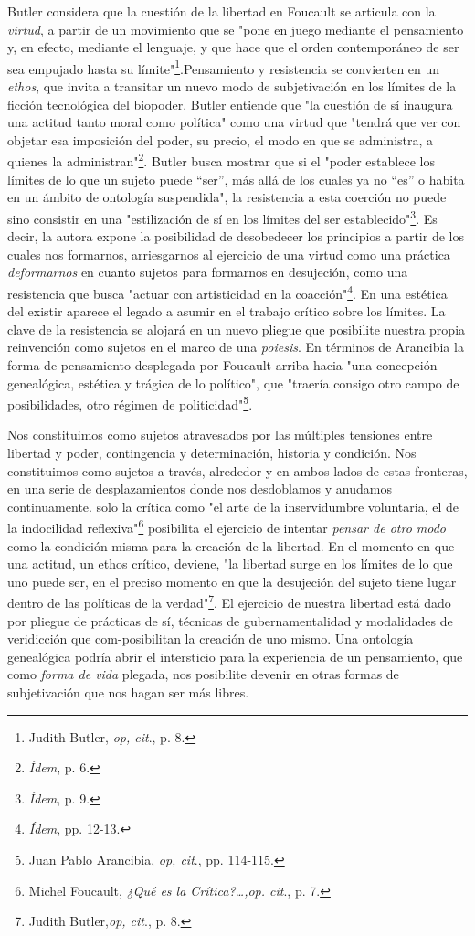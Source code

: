Butler considera que la cuestión de la libertad en Foucault se articula
con la \emph{virtud}, a partir de un movimiento que se "pone en juego
mediante el pensamiento y, en efecto, mediante el lenguaje, y que hace
que el orden contemporáneo de ser sea empujado hasta su
límite"\footnote{Judith Butler, \emph{op, cit}., p. 8.}.Pensamiento y
resistencia se convierten en un \emph{ethos}, que invita a transitar un
nuevo modo de subjetivación en los límites de la ficción tecnológica del
biopoder. Butler entiende que "la cuestión de sí inaugura una actitud
tanto moral como política" como una virtud que "tendrá que ver con
objetar esa imposición del poder, su precio, el modo en que se
administra, a quienes la administran"\footnote{\emph{Ídem}, p. 6.}.
Butler busca mostrar que si el "poder establece los límites de lo que un
sujeto puede ``ser'', más allá de los cuales ya no ``es'' o habita en un
ámbito de ontología suspendida", la resistencia a esta coerción no puede
sino consistir en una "estilización de sí en los límites del ser
establecido"\footnote{\emph{Ídem}, p. 9.}. Es decir, la autora expone la
posibilidad de desobedecer los principios a partir de los cuales nos
formarnos, arriesgarnos al ejercicio de una virtud como una práctica
\emph{deformarnos} en cuanto sujetos para formarnos en desujeción, como
una resistencia que busca "actuar con artisticidad en la
coacción"\footnote{\emph{Ídem}, pp. 12-13.}. En una estética del existir
aparece el legado a asumir en el trabajo crítico sobre los límites. La
clave de la resistencia se alojará en un nuevo pliegue que posibilite
nuestra propia reinvención como sujetos en el marco de una
\emph{poiesis}. En términos de Arancibia la forma de pensamiento
desplegada por Foucault arriba hacia "una concepción genealógica,
estética y trágica de lo político", que "traería consigo otro campo de
posibilidades, otro régimen de politicidad"\footnote{Juan Pablo
  Arancibia, \emph{op, cit}., pp. 114-115.}.

Nos constituimos como sujetos atravesados por las múltiples tensiones
entre libertad y poder, contingencia y determinación, historia y
condición. Nos constituimos como sujetos a través, alrededor y en ambos
lados de estas fronteras, en una serie de desplazamientos donde nos
desdoblamos y anudamos continuamente. solo la crítica como "el arte de
la inservidumbre voluntaria, el de la indocilidad reflexiva"\footnote{Michel
  Foucault, \emph{¿Qué es la Crítica?\ldots,op. cit}., p. 7.} posibilita
el ejercicio de intentar \emph{pensar de otro modo} como la condición
misma para la creación de la libertad. En el momento en que una actitud,
un ethos crítico, deviene, "la libertad surge en los límites de lo que
uno puede ser, en el preciso momento en que la desujeción del sujeto
tiene lugar dentro de las políticas de la verdad"\footnote{Judith
  Butler,\emph{op, cit}., p. 8.}. El ejercicio de nuestra libertad está
dado por pliegue de prácticas de sí, técnicas de gubernamentalidad y
modalidades de veridicción que com-posibilitan la creación de uno mismo.
Una ontología genealógica podría abrir el intersticio para la
experiencia de un pensamiento, que como \emph{forma de vida} plegada,
nos posibilite devenir en otras formas de subjetivación que nos hagan
ser más libres.

